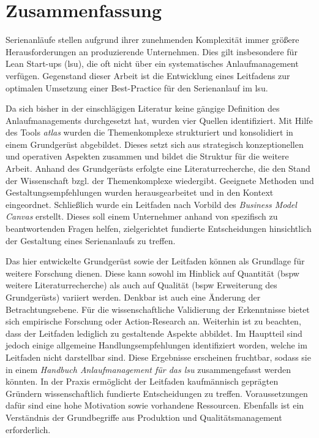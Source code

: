\chapter*{Zusammenfassung}
Serienanläufe stellen aufgrund ihrer zunehmenden Komplexität immer größere Herausforderungen an produzierende Unternehmen. Dies gilt insbesondere für Lean Start-ups (\gls{lsu}), die oft nicht über ein systematisches Anlaufmanagement verfügen.
Gegenstand dieser Arbeit ist die Entwicklung eines Leitfadens zur optimalen Umsetzung einer Best-Practice für den Serienanlauf im \gls{lsu}.

Da sich bisher in der einschlägigen Literatur keine gängige Definition des Anlaufmanagements durchgesetzt hat, wurden vier Quellen identifiziert. 
% 
Mit Hilfe des Tools \textit{\gls{atlas}} wurden die Themenkomplexe strukturiert und konsolidiert in einem Grundgerüst abgebildet. Dieses setzt sich aus strategisch konzeptionellen und operativen Aspekten zusammen und bildet die Struktur für die weitere Arbeit. 
Anhand des Grundgerüsts erfolgte eine Literaturrecherche, die den Stand der Wissenschaft bzgl. der Themenkomplexe wiedergibt. Geeignete Methoden und Gestaltungsempfehlungen wurden herausgearbeitet und in den Kontext eingeordnet. 
Schließlich wurde ein Leitfaden nach Vorbild des \textit{Business Model Canvas} erstellt. Dieses soll einem Unternehmer anhand von spezifisch zu beantwortenden Fragen helfen, zielgerichtet fundierte Entscheidungen hinsichtlich der Gestaltung eines Serienanlaufs zu treffen. 
% 

Das hier entwickelte Grundgerüst sowie der Leitfaden können als Grundlage für weitere Forschung dienen. Diese kann sowohl im Hinblick auf Quantität (\gls{bspw} weitere Literaturrecherche) als auch auf Qualität (\gls{bspw} Erweiterung des Grundgerüsts) variiert werden. Denkbar ist auch eine Änderung der Betrachtungsebene. Für die wissenschaftliche Validierung der Erkenntnisse bietet sich empirische Forschung oder Action-Research an. 
Weiterhin ist zu beachten, dass der Leitfaden lediglich zu gestaltende Aspekte abbildet. Im Hauptteil sind jedoch einige allgemeine Handlungsempfehlungen identifiziert worden, welche im Leitfaden nicht darstellbar sind. Diese Ergebnisse erscheinen fruchtbar, sodass sie in einem \textit{Handbuch Anlaufmanagement für das \gls{lsu}} zusammengefasst werden könnten.
% 
In der Praxis ermöglicht der Leitfaden kaufmännisch geprägten Gründern wissenschaftlich fundierte Entscheidungen zu treffen. Voraussetzungen dafür sind eine hohe Motivation sowie vorhandene Ressourcen. Ebenfalls ist ein Verständnis der Grundbegriffe aus Produktion und Qualitätsmanagement erforderlich. 

